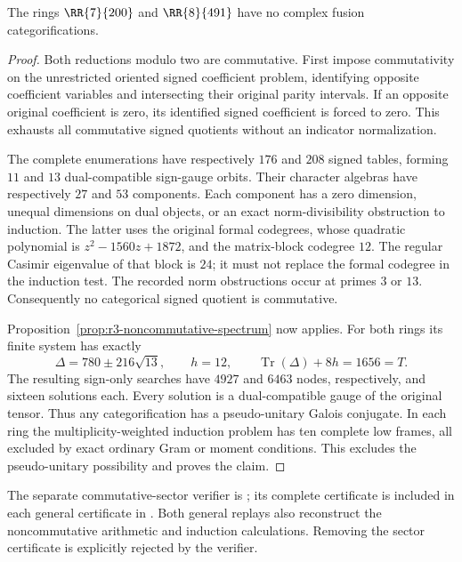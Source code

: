 \begin{theorem}\label{thm:r3-noncommutative-sector-exclusions}
The rings $\RR{7}{200}$ and $\RR{8}{491}$ have no complex fusion
categorifications.
\end{theorem}
\begin{proof}
Both reductions modulo two are commutative. First impose commutativity
on the unrestricted oriented signed coefficient problem, identifying
opposite coefficient variables and intersecting their original parity
intervals. If an opposite original coefficient is zero, its identified
signed coefficient is forced to zero. This exhausts all commutative
signed quotients without an indicator normalization.

The complete enumerations have respectively $176$ and $208$ signed
tables, forming $11$ and $13$ dual-compatible sign-gauge orbits.
Their character algebras have respectively $27$ and $53$ components.
Each component has a zero dimension, unequal dimensions on dual
objects, or an exact norm-divisibility obstruction to induction.
The latter uses the original formal codegrees, whose quadratic
polynomial is $z^2-1560z+1872$, and the matrix-block codegree $12$.
The regular Casimir eigenvalue of that block is $24$; it must not
replace the formal codegree in the induction test. The recorded
norm obstructions occur at primes $3$ or $13$. Consequently no
categorical signed quotient is commutative.

Proposition~\ref{prop:r3-noncommutative-spectrum} now applies.
For both rings its finite system has exactly
\[
 \Delta=780\pm216\sqrt{13},\qquad h=12,\qquad
 \operatorname{Tr}(\Delta)+8h=1656=T.
\]
The resulting sign-only searches have $4927$ and $6463$ nodes,
respectively, and sixteen solutions each. Every solution is a
dual-compatible gauge of the original tensor. Thus any
categorification has a pseudo-unitary Galois conjugate. In each
ring the multiplicity-weighted induction problem has ten complete
low frames, all excluded by exact ordinary Gram or moment conditions.
This excludes the pseudo-unitary possibility and proves the claim.
\end{proof}

The separate commutative-sector verifier is
; its complete
certificate is included in each general certificate in
.
Both general replays also reconstruct the noncommutative arithmetic
and induction calculations. Removing the sector certificate is
explicitly rejected by the verifier.

